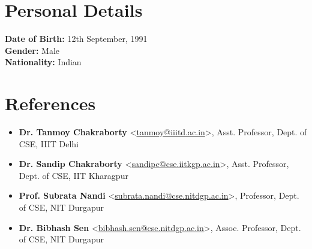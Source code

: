 \documentclass[margin, centered]{res}
\begin{document}
\begin{resume}

\section{Personal Details}
\textbf{Date of Birth:} 12th September, 1991 \\
\textbf{Gender:} Male \\ 
\textbf{Nationality:} Indian

\section{References}
\begin{itemize}[leftmargin=*]
\item[] \textbf{Dr. Tanmoy Chakraborty} \textless \href{mailto:tanmoy@iiitd.ac.in}{tanmoy@iiitd.ac.in}\textgreater, Asst. Professor, Dept. of CSE, IIIT Delhi
\item[] \textbf{Dr. Sandip Chakraborty} \textless \href{mailto:sandipc@cse.iitkgp.ac.in}{sandipc@cse.iitkgp.ac.in}\textgreater, Asst. Professor, Dept. of CSE, IIT Kharagpur
\item[] \textbf{Prof. Subrata Nandi} \textless \href{mailto:subrata.nandi@cse.nitdgp.ac.in}{subrata.nandi@cse.nitdgp.ac.in}\textgreater, Professor, Dept. of CSE, NIT Durgapur
\item[] \textbf{Dr. Bibhash Sen} \textless \href{mailto:bibhash.sen@cse.nitdgp.ac.in}{bibhash.sen@cse.nitdgp.ac.in}\textgreater, Assoc. Professor, Dept. of CSE, NIT Durgapur

\end{itemize}


\end{resume}
\end{document}
